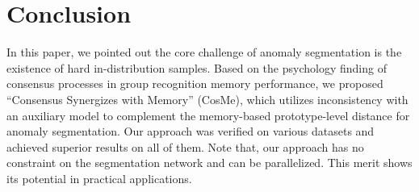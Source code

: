 \documentclass[10pt,twocolumn,letterpaper]{article}
\begin{document}
\section{Conclusion}
In this paper, we pointed out the core challenge of anomaly segmentation is the existence of hard in-distribution samples. Based on the psychology finding of consensus processes in group recognition memory performance, we proposed ``Consensus Synergizes with Memory'' (CosMe), which utilizes inconsistency with an auxiliary model to complement the memory-based prototype-level distance for anomaly segmentation. Our approach was verified on various datasets and achieved superior results on all of them.
Note that, our approach has no constraint on the segmentation network and can be parallelized. This merit shows its potential in practical applications.

{\small


}
\end{document}
